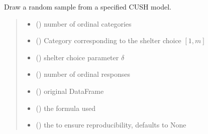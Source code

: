 \documentclass[letterpaper,10pt,english]{sphinxmanual}
\begin{document}

\begin{fulllineitems}
\label{\detokenize{cubmods:cubmods.cush.draw}}
\pysigstartsignatures
{}
\pysigstopsignatures
\sphinxAtStartPar
Draw a random sample from a specified CUSH model.
\begin{quote}\begin{description}
\begin{itemize}
\item {} 
\sphinxAtStartPar
{} () \textendash{} number of ordinal categories

\item {} 
\sphinxAtStartPar
{} () \textendash{} Category corresponding to the shelter choice \([1,m]\)

\item {} 
\sphinxAtStartPar
{} () \textendash{} shelter choice parameter \(\delta\)

\item {} 
\sphinxAtStartPar
{} () \textendash{} number of ordinal responses

\item {} 
\sphinxAtStartPar
{} () \textendash{} original DataFrame

\item {} 
\sphinxAtStartPar
{} () \textendash{} the formula used

\item {} 
\sphinxAtStartPar
{} (\sphinxstyleliteralemphasis{\sphinxupquote{, }}) \textendash{} the  to ensure reproducibility, defaults to None


\end{itemize}
\end{description}
\end{quote}
\end{fulllineitems}
\end{document}
